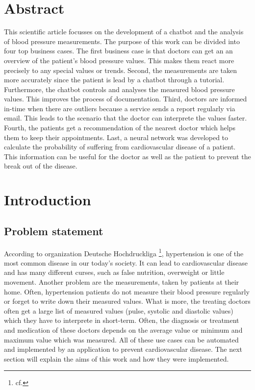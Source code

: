 



\chapter{Abstract}\label{abstract}

This scientific article focusses on the development of a chatbot and the analysis of blood pressure measurements.
The purpose of this work can be divided into four top business cases. The first business case is that doctors can get an  an overview of the patient's blood pressure values. This makes them react more precisely to any special values or trends. 
Second, the measurements are taken more accurately since the patient is lead by a chatbot through a tutorial. Furthermore, the chatbot controls and analyses the measured blood pressure values. This improves the process of documentation.
Third, doctors are informed in-time when there are outliers because a service sends a report regularly via email. This leads to the scenario that the doctor can interprete the values faster.
Fourth, the patients get a recommendation of the nearest doctor which helps them to keep their appointments.
Last, a neural network was developed to calculate the probability of suffering from cardiovascular disease of a patient. This information can be useful for the doctor as well as the patient to prevent the break out of the disease.

\chapter{Introduction}\label{introduction}

\section{Problem statement}
According to organization Deutsche Hochdruckliga \footnote{cf.\autocite{hochdruckliga}}, hypertension is one of the most common disease in our today's society. It can lead to cardiovascular disease and has many different curses, such as false nutrition, overweight or little movement.
Another problem are the measurements, taken by patients at their home. Often, hypertension patients do not measure their blood pressure regularly or forget to write down their measured values. 
What is more, the treating doctors often get a large list of measured values (pulse, systolic and diastolic values) which they have to interprete in short-term. Often, the diagnosis or treatment and medication of these doctors depends on the average value or minimum and maximum value which was measured. 
All of these use cases can be automated and implemented by an application to prevent cardiovascular disease. The next section will explain the aims of this work and how they were implemented.

